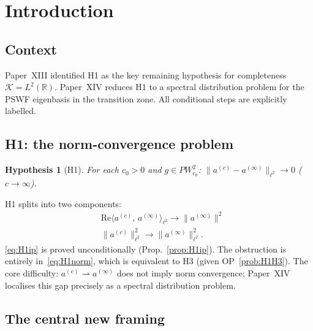 \documentclass[12pt,a4paper]{amsart}
\newtheorem{hypothesis}[theorem]{Hypothesis}
\theoremstyle{definition}
\theoremstyle{remark}
\newcommand{\norm}[1]{\|#1\|}
\newcommand{\ip}[2]{\langle #1,\, #2\rangle}
\newcommand{\PW}{PW}
\newcommand{\Kspace}{\mathcal{K}}
\begin{document}
\maketitle

\section{Introduction}
\label{sec:intro}

\subsection{Context}

Paper~XIII identified H1 as the key
remaining hypothesis for completeness
$\Kspace=L^2(\mathbb{R})$.
Paper~XIV reduces H1 to a spectral
distribution problem for the
PSWF eigenbasis in the transition zone.
All conditional steps are explicitly labelled.

\subsection{H1: the norm-convergence problem}

\begin{hypothesis}[H1]
\label{hyp:H1}
For each $c_0>0$ and $g\in\PW_{c_0}^2$:
$\norm{a^{(c)}-a^{(\infty)}}_{\ell^2}\to 0$
($c\to\infty$).
\end{hypothesis}

H1 splits into two components:
\begin{align}
  &\mathrm{Re}\ip{a^{(c)}}{a^{(\infty)}}_{\ell^2}
    \to\norm{a^{(\infty)}}^2
    \tag{H1-ip}\label{eq:H1ip}\\
  &\norm{a^{(c)}}^2_{\ell^2}
    \to\norm{a^{(\infty)}}^2_{\ell^2}.
    \tag{H1-norm}\label{eq:H1norm}
\end{align}
\eqref{eq:H1ip} is proved unconditionally
(Prop.~\ref{prop:H1ip}).
The obstruction is entirely in~\eqref{eq:H1norm},
which is equivalent to H3
(given OP~\ref{prob:H1H3}).
The core difficulty:
$a^{(c)}\rightharpoonup a^{(\infty)}$
does not imply norm convergence;
Paper~XIV localises this gap precisely
as a spectral distribution problem.

\subsection{The central new framing}
\end{document}
